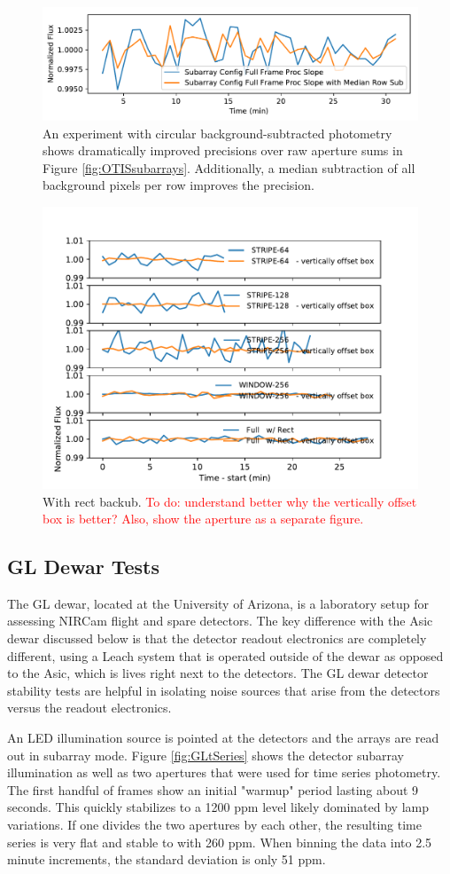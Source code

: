 \documentclass{aastex62}
\begin{document}
{\begin{figure}[!hbtp]
\centering
\includegraphics[width=.5\columnwidth]{fullframe_background_sub_compare_tser_tools.pdf}
\caption{An experiment with circular background-subtracted photometry shows dramatically improved precisions over raw aperture sums in Figure \ref{fig:OTISsubarrays}.
Additionally, a median subtraction of all background pixels per row improves the precision.}\label{fig:OTISSubConfigCircularAp}
\end{figure}

\begin{figure}[!hbtp]
\centering
\includegraphics[width=.5\columnwidth]{subarray_config_tser_backsub_rect.pdf}
\caption{With rect backub.
\textcolor{red}{To do: understand better why the vertically offset box is better? Also, show the aperture as a separate figure.}}\label{fig:OTISRectBacksub}
\end{figure}

\subsection{GL Dewar Tests}

The GL dewar, located at the University of Arizona, is a laboratory setup for assessing NIRCam flight and spare detectors.
The key difference with the Asic dewar discussed below is that the detector readout electronics are completely different, using a Leach system that is operated outside of the dewar as opposed to the Asic, which is lives right next to the detectors.
The GL dewar detector stability tests are helpful in isolating noise sources that arise from the detectors versus the readout electronics.

An LED illumination source is pointed at the detectors and the arrays are read out in subarray mode.
Figure \ref{fig:GLtSeries} shows the detector subarray illumination as well as two apertures that were used for time series photometry.
The first handful of frames show an initial "warmup" period lasting about 9 seconds.
This quickly stabilizes to a 1200 ppm level likely dominated by lamp variations.
If one divides the two apertures by each other, the resulting time series is very flat and stable to with 260 ppm.
When binning the data into 2.5 minute increments, the standard deviation is only 51 ppm.


}
\end{document}
